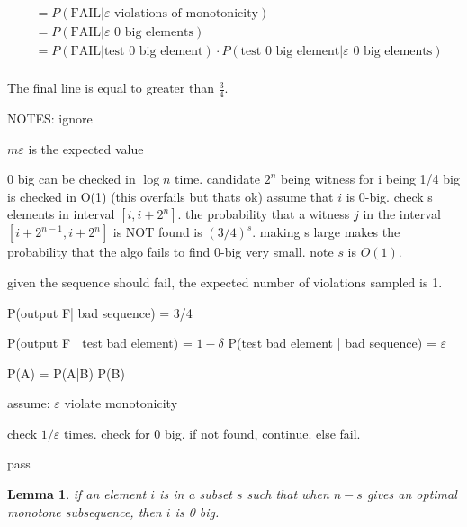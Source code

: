 \documentclass{article}
\newtheorem{lemma}[theorem]{Lemma}
\begin{document}
\begin{equation}
    \begin{split}
        &=P(\text{FAIL}|\varepsilon \text{ violations of monotonicity}) \\
        &= P(\text{FAIL}|\text{$\varepsilon$ 0 big elements}) \\
        &= P(\text{FAIL}|\text{test 0 big element}) \cdot P(\text{test 0 big element}|\text{$\varepsilon$ 0 big elements})\\
    \end{split}
\end{equation}

The final line is equal to greater than \(\frac{3}{4}\).




\newpage
NOTES: ignore



\(m \varepsilon\) is the expected value


0 big can be checked in \(\log n\) time.
candidate \(2^{n}\) being witness for i being 1/4 big is checked in O(1) (this overfails but thats ok)
assume that \(i\) is 0-big. check s elements in interval \([i,i+2^{n}]\). the probability that a witness \(j\) in the interval \([i+2^{n-1},i+2^{n}]\) is NOT found is \((3/4)^s\). making s large makes the probability that the algo fails to find 0-big very small. note \(s\) is \(O(1)\). 







given the sequence should fail, the expected number of violations sampled is 1. 

P(output F| bad sequence) = 3/4

P(output F | test bad element) = \(1-\delta\)
P(test bad element | bad sequence) = \(\varepsilon\) 

P(A) = P(A|B) P(B)


assume:
\(\varepsilon\) violate monotonicity 







check \(1/\varepsilon\) times. 
    check for 0 big. if not found, continue. else fail.

pass




\begin{lemma}
    if an element \(i\) is in a subset \(s\) such that when \(n-s\) gives an optimal monotone subsequence, then \(i\) is 0 big.
\end{lemma} 
\end{document}
